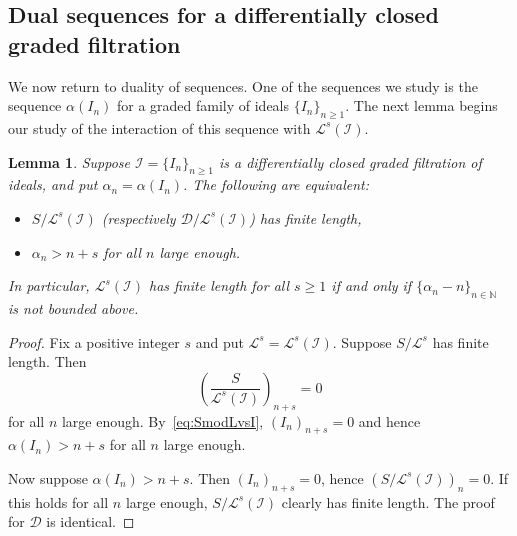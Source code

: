 \documentclass[12pt, reqno]{amsart}
\numberwithin{equation}{section}
\newcommand{\N}{{\mathbb N}}
\newcommand{\cL}{{\mathcal L}}
\newcommand{\I}{{\mathcal I}}
\theoremstyle{plain} %
\newtheorem{lem}[thm]{Lemma}
\theoremstyle{definition}
\theoremstyle{remark}
\begin{document}
\subsection{Dual sequences for a differentially closed graded filtration}\label{ss:DualSequencesDifferentiallyClosedFiltrations}
We now return to duality of sequences.  One of the sequences we study is the sequence $\alpha(I_n)$ for a graded family of ideals $\{I_n\}_{n\ge 1}$.  The next lemma begins our study of the interaction of this sequence with $\cL^s(\I)$.

\begin{lem}\label{lem:FiniteLength}
Suppose $\I=\{I_n\}_{n\ge 1}$ is a differentially closed graded filtration of ideals, and put $\alpha_n=\alpha(I_n)$.  The following are equivalent:
\begin{itemize}
\item $S/\cL^s(\I)$ (respectively $\mathcal{D}/\cL^s(\I)$) has finite length,
\item $\alpha_n > n+s$ for all $n$ large enough.
\end{itemize}
In particular, $\cL^s(\I)$ has finite length for all $s\ge 1$ if and only if $\{\alpha_n-n\}_{n\in\N}$ is not bounded above.
\end{lem}
\begin{proof}
Fix a positive integer $s$ and put $\cL^s=\cL^s(\I)$.  Suppose $S/\cL^s$ has finite length.  Then
\[
\left(\frac{S}{\cL^s(\I)}\right)_{n+s}=0
\]
for all $n$ large enough.  By~\eqref{eq:SmodLvsI}, $(I_{n})_{n+s}=0$ and hence $\alpha(I_n)>n+s$ for all $n$ large enough.

Now suppose $\alpha(I_n)>n+s$.  Then $(I_n)_{n+s}=0$, hence $(S/\cL^s(\I))_n=0$.  If this holds for all $n$ large enough, $S/\cL^s(\I)$ clearly has finite length.  The proof for $\mathcal{D}$ is identical.
\end{proof}
\end{document}
